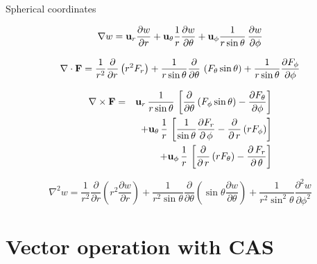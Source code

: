 \documentclass[handout,10pt]{beamer}
\begin{document}
\begin{frame}[shrink=00]{Spherical coordinates}


%
\begin{equation}
 \nabla w = {\bf u}_r \frac{\partial w}{\partial r} +   {\bf u}_\theta \frac{1}{r} \frac{\partial w}{\partial \theta} + {\bf u}_\phi \frac{1}{r \sin \theta} \, \frac{\partial w}{\partial \phi} 
  \label{graddefs}
\end{equation}
%


%
\begin{equation}
 \nabla \cdot {\bf F} = \frac{1}{r^2} \frac{\partial}{\partial r} \left(r^2 F_r \right) +  
\frac{1}{r \sin \theta}  \frac{\partial }{\partial \theta} \, \left( F_\theta \sin\theta\right) + \frac{1}{r \sin \theta}  \frac{\partial F_\phi}{\partial \phi}
 \label{divdefs}
\end{equation}
%



%
\begin{eqnarray}
 \nabla \times {\bf F} & =  &
{\bf u}_r  \, \frac{1}{r \sin \theta} \, \left[ \frac{\partial}{\partial \theta} \left( F_\phi \sin \theta\right)  - \frac{\partial F_\theta}{\partial \phi} \right]
\nonumber \\
& &  +  {\bf u}_\theta \, \frac{1}{r} \, \left[  \frac{1}{\sin\theta} \frac{\partial F_r}{\partial\,\phi} -  \frac{\partial }{\partial\,r} \left( r F_\phi\right)\right] \nonumber \\
& & + {\bf u}_\phi \, \frac{1}{r} \, \left[ \frac{\partial }{\partial\,r}\left( r F_\theta \right)-\frac{\partial \,{F}_{r}}{\partial\,\theta}\right] 
 \label{curldefs}
\end{eqnarray}
%


%
\begin{equation}
  \nabla^2 w  = \frac{1}{r^2}\frac{\partial}{\partial r}\left(r^2  \frac{\partial w}{\partial r}\right)  +   
 \frac{1}{r^2 \sin \theta}   \frac{\partial}{\partial \theta}  \left(  \sin \theta\frac{\partial w}{\partial \theta} \right) 
+  \frac{1}{r^2 \sin^2 \theta}\frac{\partial^2 w}{\partial \phi^2}  
  \label{Laplacians}
\end{equation}
%

\end{frame}

\section{Vector operation with CAS}
\end{document}
